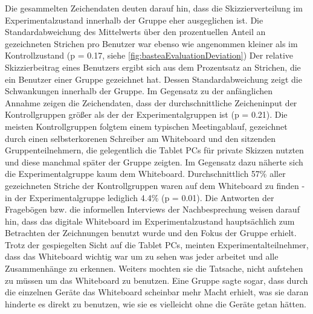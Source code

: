 \medskip Die gesammelten Zeichendaten deuten darauf hin, dass die Skizzierverteilung im Experimentalzustand innerhalb der Gruppe eher ausgeglichen ist. Die Standardabweichung des Mittelwerts über den prozentuellen Anteil an gezeichneten Strichen pro Benutzer war ebenso wie angenommen kleiner als im Kontrollzustand (p = 0.17, siehe \autoref{fig:basteaEvaluationDeviation})
Der relative Skizzierbeitrag eines Benutzers ergibt sich aus dem Prozentsatz an Strichen, die ein Benutzer einer Gruppe gezeichnet hat. Dessen Standardabweichung zeigt die Schwankungen innerhalb der Gruppe. Im Gegensatz zu der anfänglichen Annahme zeigen die Zeichendaten, dass der durchschnittliche Zeicheninput der Kontrollgruppen größer als der der Experimentalgruppen ist (p = 0.21).
Die meisten Kontrollgruppen folgtem einem typischen Meetingablauf, gezeichnet durch einen selbsterkorenen Schreiber am Whiteboard und den sitzenden Gruppenteilnehmern, die gelegentlich die Tablet PCs für private Skizzen nutzten und diese manchmal später der Gruppe zeigten. Im Gegensatz dazu näherte sich die Experimentalgruppe kaum dem Whiteboard. Durchschnittlich 57\% aller gezeichneten Striche der Kontrollgruppen waren auf dem Whiteboard zu finden - in der Experimentalgruppe lediglich 4.4\% (p = 0.01). Die Antworten der Fragebögen bzw. die informellen Interviews der Nachbesprechung weisen darauf hin, dass das digitale Whiteboard im Experimentalzustand hauptsächlich zum Betrachten der Zeichnungen benutzt wurde und den Fokus der Gruppe erhielt. Trotz der gespiegelten Sicht auf die Tablet PCs, meinten Experimentalteilnehmer, dass das Whiteboard  wichtig war um zu sehen was jeder arbeitet und alle Zusammenhänge zu erkennen. Weiters mochten sie die Tatsache, nicht aufstehen zu müssen um das Whiteboard zu benutzen. Eine Gruppe sagte sogar, dass durch die einzelnen Geräte das Whiteboard scheinbar mehr Macht erhielt, was sie daran hinderte es direkt zu benutzen, wie sie es vielleicht ohne die Geräte getan hätten.

